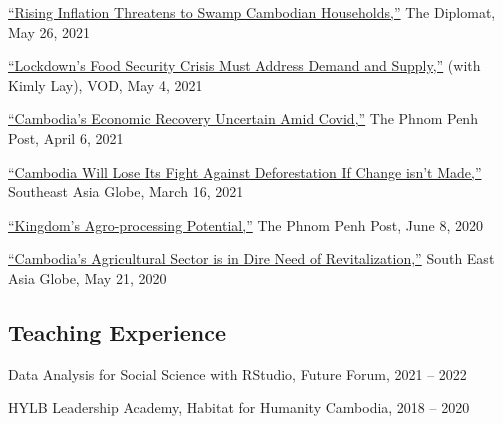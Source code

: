 \documentclass[10pt,a4paper]{article}
\begin{document}
	\href{https://thediplomat.com/2021/05/rising-inflation-threatens-to-swamp-cambodian-households/}{``Rising Inflation Threatens to Swamp Cambodian Households,''} The Diplomat, May 26, 2021\\ \vspace{-.5em}

	\href{https://vodenglish.news/opinion-lockdowns-food-security-crisis-must-address-demand-and-supply/}{``Lockdown's Food Security Crisis Must Address Demand and Supply,''} (with Kimly Lay), VOD, May 4, 2021\\ \vspace{-.5em}

	\href{https://www.phnompenhpost.com/opinion/cambodias-economic-recovery-uncertain-amid-covid}{``Cambodia's Economic Recovery Uncertain Amid Covid,''} The Phnom Penh Post, April 6, 2021\\ \vspace{-.5em}

	\href{https://southeastasiaglobe.com/cambodia-deforestation-fight/}{``Cambodia Will Lose Its Fight Against Deforestation If Change isn't Made,''} Southeast Asia Globe, March 16, 2021\\ \vspace{-.5em}

	\href{https://www.phnompenhpost.com/opinion/kingdoms-agro-processing-potential}{``Kingdom’s Agro-processing Potential,''} The Phnom Penh Post, June 8, 2020\\  \vspace{-.5em}

	 \href{https://southeastasiaglobe.com/cambodias-agricultural-sector-is-one-in-dire-need-of-revitalising}{``Cambodia’s Agricultural Sector is in Dire Need of Revitalization,''} South East Asia Globe, May 21, 2020

\subsection*{Teaching Experience}

Data Analysis for Social Science with RStudio, Future Forum, 2021 -- 2022
	
HYLB Leadership Academy, Habitat for Humanity Cambodia, 2018 -- 2020

\end{document}
